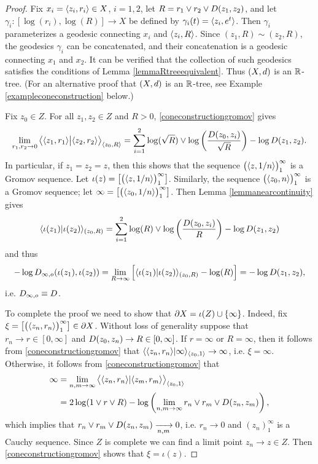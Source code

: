 \begin{proof}
Fix $x_i = \langle z_i,r_i\rangle \in X$, $i = 1,2$, let $R = r_1\vee r_2\vee D(z_1,z_2)$, and let $\gamma_i:[\log(r_i),\log(R)]\to X$ be defined by $\gamma_i(t) = \langle z_i,e^t\rangle$. Then $\gamma_i$ parameterizes a geodesic connecting $x_i$ and $\langle z_i,R\rangle$. Since $(z_1,R) \sim (z_2,R)$, the geodesics $\gamma_i$ can be concatenated, and their concatenation is a geodesic connecting $x_1$ and $x_2$. It can be verified that the collection of such geodesics satisfies the conditions of Lemma \ref{lemmaRtreeequivalent}. Thus $(X,d)$ is an $\R$-tree. (For an alternative proof that $(X,d)$ is an $\R$-tree, see Example \ref{exampleconeconstruction} below.)

Fix $z_0\in Z$. For all $z_1,z_2\in Z$ and $R > 0$, \eqref{coneconstructiongromov} gives
\[
\lim_{r_1,r_2\to 0} \big\langle \langle z_1,r_1\rangle \big| \langle z_2,r_2\rangle \big\rangle_{\langle z_0,R\rangle} = \sum_{i = 1}^2 \log(\sqrt R)\vee\log\left(\frac{D(z_0,z_i)}{\sqrt R}\right) - \log D(z_1,z_2).
\]
In particular, if $z_1 = z_2 = z$, then this shows that the sequence $\big(\langle z,1/n\rangle\big)_1^\infty$ is a Gromov sequence. Let $\iota(z) = \left[\big(\langle z,1/n\rangle\big)_1^\infty\right]$. Similarly, the sequence $\big(\langle z_0,n\rangle\big)_1^\infty$ is a Gromov sequence; let $\infty = \left[\big(\langle z_0,1/n\rangle\big)_1^\infty\right]$. Then Lemma \ref{lemmanearcontinuity} gives
\[
\langle \iota(z_1) | \iota(z_2)\rangle_{(z_0,R)} = \sum_{i = 1}^2 \log(R)\vee\log\left(\frac{D(z_0,z_i)}{R}\right) - \log D(z_1,z_2)
\]
and thus
\[
-\log D_{\infty,o}(\iota(z_1),\iota(z_2)) = \lim_{R\to\infty} \Big[ \langle \iota(z_1) | \iota(z_2)\rangle_{(z_0,R)} - \log(R) \Big] = -\log D(z_1,z_2),
\]
i.e. $D_{\infty,o}\equiv D$.

To complete the proof we need to show that $\partial X = \iota(Z)\cup\{\infty\}$. Indeed, fix $\xi = \left[\big(\langle z_n,r_n\rangle\big)_1^\infty\right]\in\partial X$. Without loss of generality suppose that $r_n\to r\in [0,\infty]$ and $D(z_0,z_n) \to R\in[0,\infty]$. If $r = \infty$ or $R = \infty$, then it follows from \eqref{coneconstructiongromov} that $\langle \langle z_n,r_n\rangle | \infty\rangle_{\langle z_0,1\rangle} \to \infty$, i.e. $\xi = \infty$. Otherwise, it follows from \eqref{coneconstructiongromov} that
\begin{align*}
\infty &= \lim_{n,m \to\infty} \big\langle \langle z_n,r_n\rangle | \langle z_m,r_m\rangle \big\rangle_{\langle z_0,1\rangle}\\ 
&= 2\log(1\vee r\vee R) - \log \left( \lim_{n,m\to\infty} r_n\vee r_m\vee D(z_n,z_m) \right),
\end{align*}
which implies that $r_n\vee r_m\vee D(z_n,z_m) \xrightarrow[n,m]{} 0$, i.e. $r_n\to 0$ and $(z_n)_1^\infty$ is a Cauchy sequence. Since $Z$ is complete we can find a limit point $z_n\to z\in Z$. Then \eqref{coneconstructiongromov} shows that $\xi = \iota(z)$.
\end{proof}


